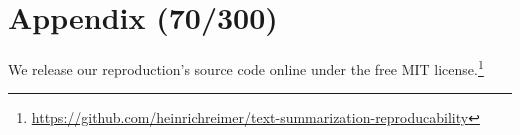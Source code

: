 \appendix
\section{Appendix (70/300)}

We release our reproduction's source code online under the free MIT license.\footnote{\url{https://github.com/heinrichreimer/text-summarization-reproducability}}
